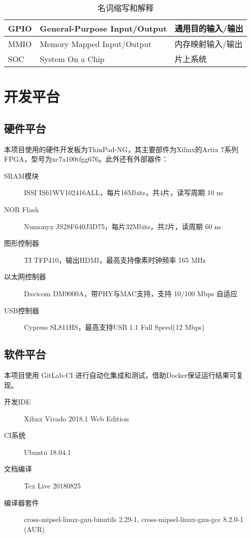 \begin{table}[!htbp]
\begin{tabular}{|l|l|l|}
    GPIO                              & General-Purpose Input/Output                       & 通用目的输入/输出                        \\ \hline
    MMIO                              & Memory Mapped Input/Output                         & 内存映射输入/输出                        \\ \hline
    SOC                               & System On a Chip                                   & 片上系统                             \\ \hline
    \end{tabular}

    \caption{名词缩写和解释}
    \label{table:abbreviation_definition}

\end{table}

\section{开发平台}

\subsection{硬件平台}

本项目使用的硬件开发板为ThinPad-NG，其主要部件为Xilinx的Artix 7系列FPGA，型号为xc7a100tfgg676。此外还有外部器件：

\begin{description}
    \item[SRAM模块] ISSI IS61WV102416ALL，每片16Mbits，共4片，读写周期 10 ns
    \item[NOR Flash] Numonyx JS28F640J3D75，每片32Mbits，共2片，读周期 60 ns
    \item[图形控制器] TI TFP410，输出HDMI，最高支持像素时钟频率 165 MHz
    \item[以太网控制器] Davicom DM9000A，带PHY与MAC支持，支持 10/100 Mbps 自适应
    \item[USB控制器] Cypress SL811HS，最高支持USB 1.1 Full Speed(12 Mbps)
\end{description}

\subsection{软件平台}
\label{section:software_platform}

本项目使用 GitLab-CI 进行自动化集成和测试，借助Docker保证运行结果可复现。

\begin{description}
    \item[开发IDE] Xilinx Vivado 2018.1 Web Edition
    \item[CI系统] Ubuntu 18.04.1
    \item[文档编译] Tex Live 20180825
    \item[编译器套件] cross-mipsel-linux-gnu-binutils 2.29-1, cross-mipsel-linux-gnu-gcc 8.2.0-1 (AUR)
\end{description}

